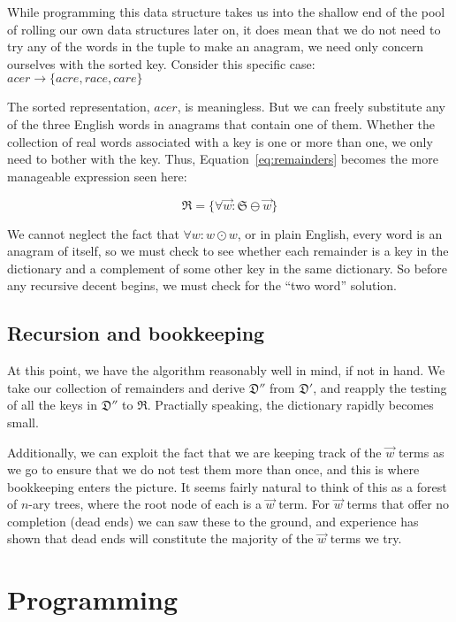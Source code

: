 \documentclass[letterpaper, 11pt]{article}
\newcommand{\Dp}{$\mathfrak{D}'$\xspace}
\newcommand{\Dpp}{$\mathfrak{D}''$\xspace}
\newcommand{\aw}{$\overrightarrow{w}$\xspace}
\begin{document}
While programming this data structure takes us into the shallow end
of the pool of rolling our own data structures later on, it does
mean that we do not need to try any of the words in the tuple to
make an anagram, we need only concern ourselves with the sorted
key. Consider this specific case: $acer \longrightarrow \{acre,
race, care\}$

The sorted representation, $acer$, is meaningless. But we can freely
substitute any of the three English words in anagrams that contain
one of them. Whether the collection of real words associated with
a key is one or more than one, we only need to bother with the key.
Thus, Equation~\ref{eq:remainders} becomes the more manageable
expression seen here:

\begin{equation}
\mathfrak{R} = \{\forall \overrightarrow{w} : \mathfrak{S} \ominus \overrightarrow{w} \}
\end{equation}

We cannot neglect the fact that $\forall w: w \odot w$, or in plain English,
every word is an anagram of itself, so we must check to see whether each
remainder is a key in the dictionary and a complement of some other
key in the same dictionary. So before any recursive decent begins, we 
must check for the ``two word'' solution.

\subsection{Recursion and bookkeeping}

At this point, we have the algorithm reasonably well in mind, if not
in hand. We take our collection of remainders and derive \Dpp from \Dp,
and reapply the testing of all the keys in \Dpp to $\mathfrak{R}$.
Practially speaking, the dictionary rapidly becomes small. 

Additionally, we can exploit the fact that we are keeping track of
the \aw terms as we go to ensure that we do not test them more than
once, and this is where bookkeeping enters the picture. It seems
fairly natural to think of this as a forest of $n$-ary trees, where
the root node of each is a \aw term. For \aw terms that offer no
completion (\ie dead ends) we can saw these to the ground, and
experience has shown that dead ends will constitute the majority
of the \aw terms we try.

\newpage
\section{Programming}
\end{document}
